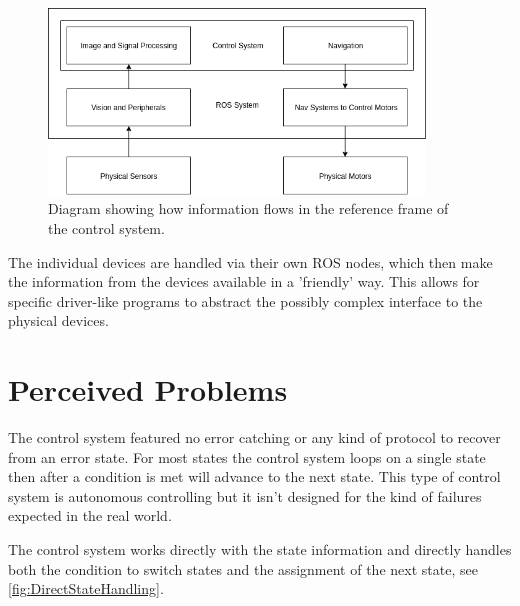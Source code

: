 \begin{figure}
\centering
\includegraphics[width=100mm]{Figures/InformationFlow}
\decoRule
\caption[Original Information Flow]{Diagram showing how information flows in the reference frame of the control system.}
\label{fig:InformationFlow}
\end{figure}

The individual devices are handled via their own ROS nodes, which then make
the information from the devices available in a 'friendly' way.
This allows for specific driver-like programs to abstract the possibly
complex interface to the physical devices.


\section{Perceived Problems}

The control system featured no error catching or any kind of protocol to recover from an error state.
For most states the control system loops on a single state then after a condition is met will advance to the next state. This type of control system is autonomous controlling but it isn't designed for the kind of failures expected in the real world.

The control system works directly with the state information and directly handles both the condition to switch states and the assignment of the next state, see \ref{fig:DirectStateHandling}.

